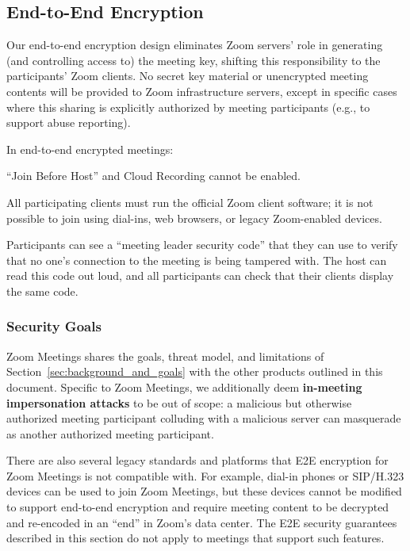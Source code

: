 \subsection{End-to-End Encryption}
Our end-to-end encryption design eliminates Zoom servers' role in generating (and controlling access
to) the meeting key, shifting this responsibility to the participants' Zoom clients. No secret key
material or unencrypted meeting contents will be provided to Zoom infrastructure servers, except in
specific cases where this sharing is explicitly authorized by meeting participants (e.g., to support
abuse reporting).

In end-to-end encrypted meetings:
\begin{itemize*}
   \item ``Join Before Host'' and Cloud Recording cannot be enabled.
   \item All participating clients must run the official Zoom client software; it is not possible to
   join using dial-ins, web browsers, or legacy Zoom-enabled devices.
   \item Participants can see a ``meeting leader security code'' that they can use to verify that no
   one's connection to the meeting is being tampered with. The host can read this code out loud, and
   all participants can check that their clients display the same code.   
\end{itemize*}

\subsubsection{Security Goals}

Zoom Meetings shares the goals, threat model, and limitations of
Section~\ref{sec:background_and_goals} with the other products outlined in this document. Specific
to Zoom Meetings, we additionally deem {\bf in-meeting impersonation attacks} to be out of scope: a
malicious but otherwise authorized meeting participant colluding with a malicious server can
masquerade as another authorized meeting participant.

There are also several legacy standards and platforms that E2E encryption for Zoom Meetings is not
compatible with. For example, dial-in phones or SIP/H.323 devices can be used to join Zoom Meetings,
but these devices cannot be modified to support end-to-end encryption and require meeting content to
be decrypted and re-encoded in an ``end'' in Zoom's data center. The E2E security guarantees
described in this section do not apply to meetings that support such features.

